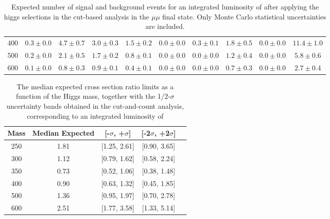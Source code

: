\begin{table}
{\begin{center}
\begin{tabular}{l | c c |  c c c c c c c }
400 & $0.3\pm0.0$ & $4.7\pm0.7$ & $3.0\pm0.3$ & $1.5\pm0.2$ & $0.0\pm0.0$ & $0.3\pm0.1$ & $1.8\pm0.5$ & $0.0\pm0.0$ & $11.4\pm1.0$ \\
500 & $0.2\pm0.0$ & $2.1\pm0.5$ & $1.7\pm0.2$ & $0.8\pm0.1$ & $0.0\pm0.0$ & $0.0\pm0.0$ & $1.2\pm0.4$ & $0.0\pm0.0$ & $5.8\pm0.6$ \\
600 & $0.1\pm0.0$ & $0.8\pm0.3$ & $0.9\pm0.1$ & $0.4\pm0.1$ & $0.0\pm0.0$ & $0.0\pm0.0$ & $0.7\pm0.3$ & $0.0\pm0.0$ & $2.7\pm0.4$ \\
\hline
\end{tabular}
\label{tab:yield_cutbased_mm}
\end{center}
}
\caption{Expected number of signal and background events for an 
  integrated luminosity of \intlumi after applying the higgs selections in the cut-based analysis in the $\mu\mu$ final state. 
  Only Monte Carlo statistical uncertainties are included. }
\end{table}

\begin{table}
\begin{center}
\begin{tabular}{ccccc}
\hline
 Mass & Median Expected & [-$\sigma$, +$\sigma$] & [-2$\sigma$, +2$\sigma$]\\\hline
 250 & 1.81 & [1.25, 2.61] & [0.90, 3.65] \\
300 & 1.12 & [0.79, 1.62] & [0.58, 2.24] \\
350 & 0.73 & [0.52, 1.06] & [0.38, 1.48] \\
400 & 0.90 & [0.63, 1.32] & [0.45, 1.85] \\
500 & 1.36 & [0.95, 1.97] & [0.70, 2.78] \\
600 & 2.51 & [1.77, 3.58] & [1.33, 5.14] \\
\hline
\end{tabular}
\end{center}
\label{tab:limits_cutbased_2fb}
\caption{\fixme The median expected cross section ratio limits as a function 
of the Higgs mass, together with the 1/2-$\sigma$ uncertainty bands obtained in the cut-and-count analysis, corresponding to 
an integrated luminosity of \intlumi}
\end{table}




